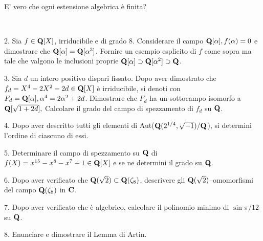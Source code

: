 E' vero che ogni estensione algebrica \`e finita?\medskip\bigskip\bigskip

\ \dotfill\ \bigskip\bigskip\bigskip


\vfil\eject


\item{2.} Sia $f\in{\bf Q}[X]$, irriducibile e di grado $8$. Considerare il campo ${\bf Q}[\alpha],f(\alpha)=0$ e dimostrare che
${\bf Q}[\alpha]={\bf Q}[\alpha^3]$. Fornire un esempio esplicito di $f$ come sopra ma tale che valgono le inclusioni proprie
${\bf Q}[\alpha]\supset{\bf Q}[\alpha^2]\supset{\bf Q}$.\vv

\item{3.} Sia $d$ un intero positivo dispari fissato. Dopo aver dimostrato che $f_d=X^4-2X^2-2d\in{\bf Q}[X]$ \`e irriducibile, si denoti con $F_d={\bf Q}[\alpha],\alpha^4=2\alpha^2+2d$.
 Dimostrare che $F_d$ ha un sottocampo isomorfo a ${\bf Q}[\sqrt{1+2d}],$
 Calcolare il grado del campo di spezzamento di $f_d$ su ${\bf Q}$.
\ve\ \vs


\item{4.} Dopo aver descritto tutti gli elementi di Aut(${\bf Q}(2^{1/4},\sqrt{-1})/{\bf Q}$), si determini l'ordine di ciascuno di essi.\vv

\item{5.} Determinare il campo di spezzamento su ${\bf Q}$ di $f(X)=x^{15} - x^8 - x^7 + 1\in{\bf Q}[X]$ e se ne determini il grado su ${\bf Q}$.
\ve\ \vs


\item{6.} Dopo aver verificato che ${\bf Q}(\sqrt{2})\subset{\bf Q}(\zeta_8)$, descrivere gli ${\bf Q}(\sqrt{2})$--omomorfismi del campo 
${\bf Q}(\zeta_8)$ in ${\bf C}$.\vv\vv


\item{7.}  Dopo aver verificato che \`e algebrico, calcolare il polinomio minimo di $\sin \pi/12$ su ${\bf Q}$. 
\vv\vv


\item{8.} Enunciare e dimostrare il Lemma di Artin.

\vv

\ \vst
 \bye
